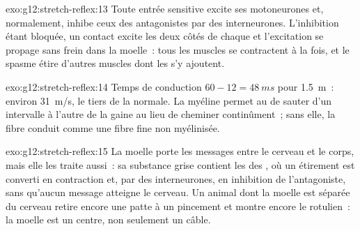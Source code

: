 \begin{solution}{exo:g12:stretch-reflex:13}
Toute entrée sensitive excite ses motoneurones et, normalement,
inhibe ceux des antagonistes par des interneurones. L'inhibition étant
bloquée, un contact excite les deux côtés de chaque  et
l'excitation se propage sans frein dans la moelle~: tous les muscles
se contractent à la fois, et le spasme étire d'autres muscles dont les
 s'y ajoutent.
\end{solution}

\begin{solution}{exo:g12:stretch-reflex:14}
Temps de conduction $60 - 12 = \qty{48}{ms}$ pour \qty{1.5}{m}~:
environ \qty{31}{m/s}, le tiers de la normale. La myéline permet au
 de sauter d'un intervalle à l'autre de la gaine au
lieu de cheminer continûment~; sans elle, la fibre conduit comme une
fibre fine non myélinisée.
\end{solution}

\begin{solution}{exo:g12:stretch-reflex:15}
La moelle porte les messages entre le cerveau et le corps, mais elle
les traite aussi~: sa substance grise contient les  des , où un étirement est converti en contraction et, par des
interneurones, en inhibition de l'antagoniste, sans qu'aucun message
atteigne le cerveau. Un animal dont la moelle est séparée du cerveau
retire encore une patte à un pincement et montre encore le 
rotulien~: la moelle est un centre, non seulement un câble.
\end{solution}

